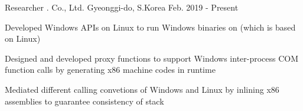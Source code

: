 

\begin{cvskills}

  \cventry
    {Researcher} %
    {\mycompany{}. Co., Ltd.} %
    {Gyeonggi-do, S.Korea} %
    {Feb. 2019 - Present} %
    {
      \begin{cvitems} %
        \item {Developed Windows APIs on Linux to run Windows binaries on \mycompany{} (which is based on Linux)}
	\item {Designed and developed proxy functions to support Windows inter-process COM function calls by generating x86 machine codes in runtime}
	\item {Mediated different calling convetions of Windows and Linux by inlining x86 assemblies to guarantee consistency of stack}
      \end{cvitems}
    }




\end{cvskills}
